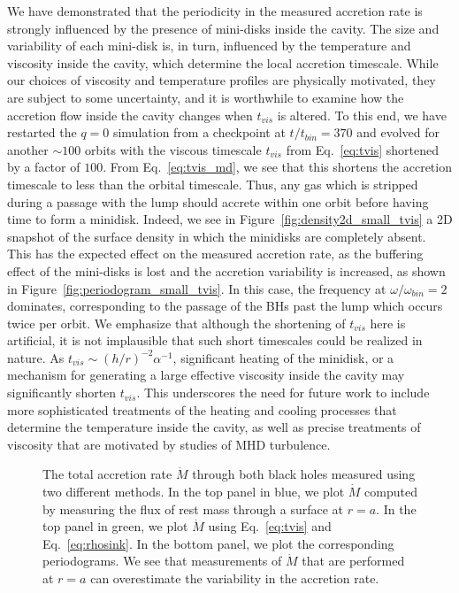 \documentclass[apj]{emulateapj}
\begin{document}
We have demonstrated that the periodicity in the measured accretion rate is strongly influenced by the presence of mini-disks inside the cavity. The size and variability of each mini-disk is, in turn, influenced by the temperature and viscosity inside the cavity, which determine the local accretion timescale. While our choices of viscosity and temperature profiles are physically motivated, they are subject to some uncertainty, and it is worthwhile to examine how the accretion flow inside the cavity changes when $t_{vis}$ is altered. To this end, we have restarted the $q=0$ simulation from a checkpoint at $t/t_{bin}=370$ and evolved for another $\sim 100$ orbits with the viscous timescale $t_{vis}$ from Eq.~\ref{eq:tvis} shortened by a factor of $100$. From Eq.~\ref{eq:tvis_md}, we see that this shortens the accretion timescale to less than the orbital timescale. Thus, any gas which is stripped during a passage with the lump should accrete within one orbit before having time to form a minidisk. Indeed, we see in Figure~\ref{fig:density2d_small_tvis} a 2D snapshot of the surface density in which the minidisks are completely absent. This has the expected effect on the measured accretion rate, as the buffering effect of the mini-disks is lost and the accretion variability is increased, as shown in Figure~\ref{fig:periodogram_small_tvis}.  In this case, the frequency at $\omega / \omega_{bin} = 2$ dominates, corresponding to the passage of the BHs past the lump which occurs twice per orbit. We emphasize that although the shortening of $t_{vis}$ here is artificial, it is not implausible that such short timescales could be realized in nature. As $t_{vis} \sim (h/r)^{-2} \alpha^{-1}$, significant heating of the minidisk, or a mechanism for generating a large effective viscosity inside the cavity may significantly shorten $t_{vis}$. This underscores the need for future work to include more sophisticated treatments of the heating and cooling processes that determine the temperature inside the cavity, as well as precise treatments of viscosity that are motivated by studies of MHD turbulence.

\begin{figure}
\caption{The total accretion rate $\dot{M}$ through both black holes measured using two different methods. In the top panel in blue, we plot $\dot{M}$ computed by measuring the flux of rest mass through a surface at $r=a$. In the top panel in green, we plot $\dot{M}$ using Eq.~\ref{eq:tvis} and Eq.~\ref{eq:rhosink}. In the bottom panel, we plot the corresponding periodograms. We see that measurements of $\dot{M}$ that are performed at $r=a$ can overestimate the variability in the accretion rate. }
\label{fig:mdot_comparison}
\end{figure}
\end{document}
